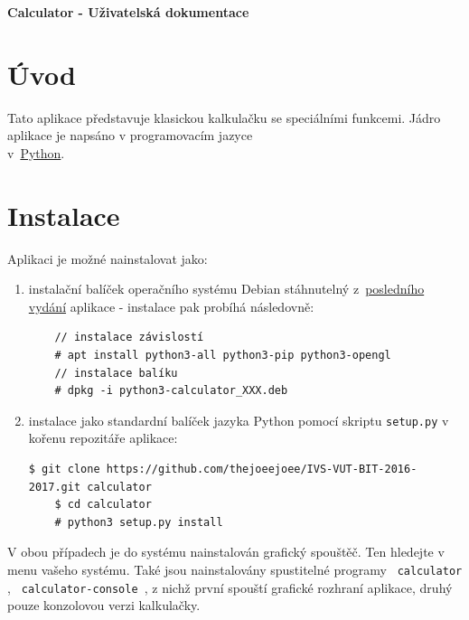 \documentclass[a4paper, 11pt]{article}
\begin{document}
\thispagestyle{empty}

{\Huge{\textbf{Calculator - Uživatelská dokumentace}}}

\vspace{2cm}

\hypersetup{
    colorlinks=true,
    linktoc=all
}

{\hypersetup{linkcolor=black}
\tableofcontents
}


\newpage

\pagestyle{fancy}

\section{Úvod}\label{uvod}

Tato aplikace představuje klasickou kalkulačku se speciálními funkcemi.
Jádro aplikace je napsáno v programovacím jazyce \\v~\href{https://www.python.org/}{Python}.

\section{Instalace}
Aplikaci je možné nainstalovat jako: \\
\begin{enumerate}
    \item instalační balíček operačního systému Debian stáhnutelný z~\href{https://github.com/thejoeejoee/IVS-VUT-BIT-2016-2017/releases/latest}{posledního vydání} aplikace - instalace pak probíhá následovně: \\
    \begin{lstlisting}
    // instalace závislostí
    # apt install python3-all python3-pip python3-opengl
    // instalace balíku
    # dpkg -i python3-calculator_XXX.deb
    \end{lstlisting}
    \item instalace jako standardní balíček jazyka Python pomocí skriptu \texttt{setup.py} v kořenu repozitáře aplikace:
    \begin{lstlisting}[breaklines]
    $ git clone https://github.com/thejoeejoee/IVS-VUT-BIT-2016-2017.git calculator
    $ cd calculator
    # python3 setup.py install
    \end{lstlisting}
\end{enumerate}

V obou případech je do systému nainstalován grafický spouštěč. Ten hledejte
v menu vašeho systému. Také jsou nainstalovány spustitelné programy
\texttt{ calculator }, \texttt{ calculator-console }, z nichž první spouští
grafické rozhraní aplikace, druhý pouze konzolovou verzi kalkulačky.
\end{document}
